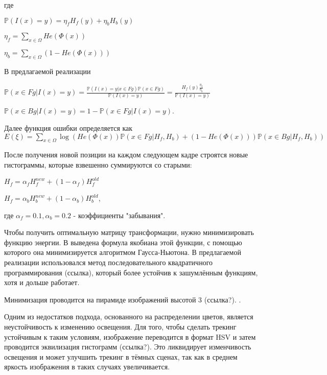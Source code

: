 где

$
    \mathbb{P}(I(x) = y) = \eta_f H_f(y) + \eta_b H_b(y)
$

$
    \eta_f = \sum\limits_{x \in \Omega}He(\Phi(x))
$

$
    \eta_b = \sum\limits_{x \in \Omega}(1 - He(\Phi(x)))
$

В предлагаемой реализации

$
    \mathbb{P}(x \in Fg | I(x) = y) = \frac{\mathbb{P}(I(x) = y | x \in Fg) \mathbb{P}(x \in Fg)}{\mathbb{P}(I(x) = y)} = \frac{H_f(y)\frac{\eta_f}{\eta_b}}{\mathbb{P}(I(x) = y)}
$

$
    \mathbb{P}(x \in Bg | I(x) = y) = 1 - \mathbb{P}(x \in Fg | I(x) = y)
$.

Далее функция ошибки определяется как
$
    E(\xi) = \sum\limits_{x \in \Omega}\log(He(\Phi(x))\mathbb{P}(x \in Fg | H_f, H_b) + (1 - He(\Phi(x)))\mathbb{P}(x \in Bg|H_f, H_b))
$

После получения новой позиции на каждом следующем кадре строятся новые
гистограммы, которые взвешенно суммируются со старыми: 

$
    H_{f} = \alpha_f H_{f}^{new} + (1 - \alpha_f) H_f^{old}
$

$
    H_{f} = \alpha_b H_{b}^{new} + (1 - \alpha_b) H_b^{old}
$, 

где $\alpha_f = 0.1, \alpha_b = 0.2$ - коэффициенты "забывания".

Чтобы получить оптимальную матрицу трансформации, нужно минимизировать функцию
энергии.
В \cite{Tjaden2018} выведена формула якобиана этой функции, с помощью которого
она минимизируется алгоритмом Гаусса-Ньютона.
В предлагаемой реализации использовался метод последовательного квадратичного
программирования (ссылка), который более устойчив к зашумлённым функциям, хотя
и дольше работает. 

Минимизация проводится на пирамиде изображений высотой 3 (ссылка?).
.


Одним из недостатков подхода, основанного на распределении цветов, является
неустойчивость к изменению освещения.
Для того, чтобы сделать трекинг устойчивым к таким условиям, изображение
переводится в формат HSV и затем проводится эквилизация гистограмм (ссылка?).
Это ликвидирует изменчивость освещения и может улучшить трекинг в тёмных
сценах, так как в среднем яркость изображения в таких случаях увеличивается.

